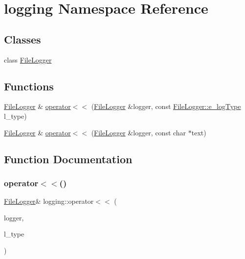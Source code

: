 \hypertarget{namespacelogging}{}\section{logging Namespace Reference}
\label{namespacelogging}
\subsection*{Classes}
\begin{DoxyCompactItemize}
\item 
class \hyperlink{classlogging_1_1_file_logger}{File\+Logger}
\end{DoxyCompactItemize}
\subsection*{Functions}
\begin{DoxyCompactItemize}
\item 
\hyperlink{classlogging_1_1_file_logger}{File\+Logger} \& \hyperlink{namespacelogging_aa6782e6e1d1e96989e4bfc29f8f85dc4}{operator$<$$<$} (\hyperlink{classlogging_1_1_file_logger}{File\+Logger} \&logger, const \hyperlink{classlogging_1_1_file_logger_a2ee70febdd1432400fa07ea2a17f0623}{File\+Logger\+::e\+\_\+log\+Type} l\+\_\+type)
\item 
\hyperlink{classlogging_1_1_file_logger}{File\+Logger} \& \hyperlink{namespacelogging_a7e47c8ca0cf4d8136496bb99b505ef5d}{operator$<$$<$} (\hyperlink{classlogging_1_1_file_logger}{File\+Logger} \&logger, const char $\ast$text)
\end{DoxyCompactItemize}


\subsection{Function Documentation}
\mbox{\label{namespacelogging_aa6782e6e1d1e96989e4bfc29f8f85dc4}} 
\subsubsection{\texorpdfstring{operator$<$$<$()}{operator<<()}\hspace{0.1cm}{\footnotesize\ttfamily [1/2]}}
{\footnotesize\ttfamily \hyperlink{classlogging_1_1_file_logger}{File\+Logger}\& logging\+::operator$<$$<$ (\begin{DoxyParamCaption}\item[{\hyperlink{classlogging_1_1_file_logger}{File\+Logger} \&}]{logger,  }\item[{const \hyperlink{classlogging_1_1_file_logger_a2ee70febdd1432400fa07ea2a17f0623}{File\+Logger\+::e\+\_\+log\+Type}}]{l\+\_\+type }\end{DoxyParamCaption})}



